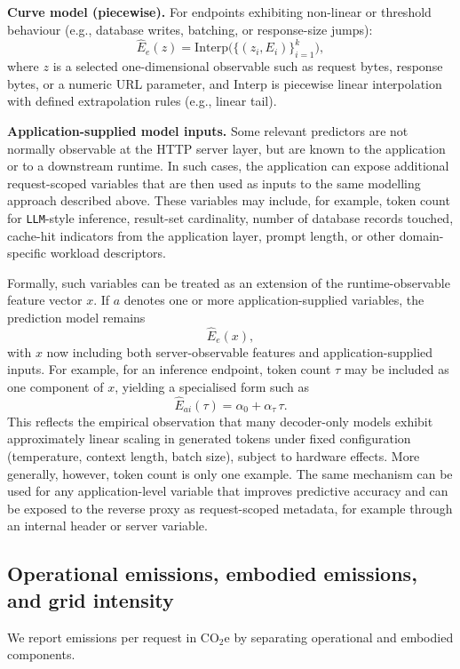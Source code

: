 \textbf{Curve model (piecewise).}
For endpoints exhibiting non-linear or threshold behaviour (e.g., database writes, batching, or response-size jumps):
\[
\widehat{E}_e(z) = \mathrm{Interp}\bigl(\{(z_i, E_i)\}_{i=1}^k\bigr),
\]
where \(z\) is a selected one-dimensional observable such as request bytes, response bytes, or a numeric URL parameter, and \(\mathrm{Interp}\) is piecewise linear interpolation with defined extrapolation rules (e.g., linear tail).

\textbf{Application-supplied model inputs.}
Some relevant predictors are not normally observable at the HTTP server layer, but are known to the application or to a downstream runtime. In such cases, the application can expose additional request-scoped variables that are then used as inputs to the same modelling approach described above. These variables may include, for example, token count for \texttt{LLM}-style inference, result-set cardinality, number of database records touched, cache-hit indicators from the application layer, prompt length, or other domain-specific workload descriptors.

Formally, such variables can be treated as an extension of the runtime-observable feature vector \(x\). If \(a\) denotes one or more application-supplied variables, the prediction model remains
\[
\widehat{E}_e(x),
\]
with \(x\) now including both server-observable features and application-supplied inputs. For example, for an inference endpoint, token count \(\tau\) may be included as one component of \(x\), yielding a specialised form such as
\[
\widehat{E}_{ai}(\tau) = \alpha_0 + \alpha_\tau \, \tau.
\]
This reflects the empirical observation that many decoder-only models exhibit approximately linear scaling in generated tokens under fixed configuration (temperature, context length, batch size), subject to hardware effects. More generally, however, token count is only one example. The same mechanism can be used for any application-level variable that improves predictive accuracy and can be exposed to the reverse proxy as request-scoped metadata, for example through an internal header or server variable.


\subsection{Operational emissions, embodied emissions, and grid intensity}
\label{subsec:emissions}
We report emissions per request in \(\mathrm{CO_2e}\) by separating operational and embodied components.

